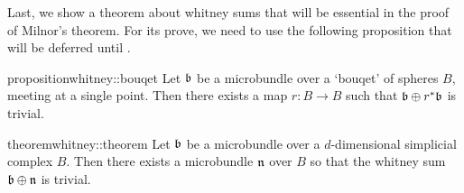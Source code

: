 \begin{myparagraph}
    Last, we show a theorem about whitney sums that will be
    essential in the proof of Milnor's theorem.
    For its prove, we need to use the following proposition
    that will be deferred until .
\end{myparagraph}

\begin{mystatement}{proposition}{whitney::bouqet}
    Let $\bb$ be a microbundle over a `bouqet' of spheres $B$, meeting at a single point.
    Then there exists a map $r: B \to B$ such that $\whitney{\bb}{\ind{r}\bb}$ is trivial.
\end{mystatement}

\begin{mystatement}{theorem}{whitney::theorem}
    Let $\bb$ be a microbundle over a $d$-dimensional simplicial complex $B$.
    Then there exists a microbundle $\mathfrak{n}$ over $B$ so that the whitney sum $\whitney{\bb}{\bn}$ is trivial.
\end{mystatement}

